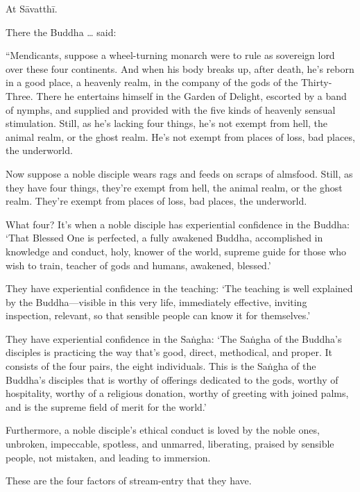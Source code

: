 \documentclass[12pt,openany]{book}%
\begin{document}
At \textsanskrit{Sāvatthī}. 

There the Buddha … said: 

“Mendicants, suppose a wheel-turning monarch were to rule as sovereign lord over these four continents. And when his body breaks up, after death, he’s reborn in a good place, a heavenly realm, in the company of the gods of the Thirty-Three. There he entertains himself in the Garden of Delight, escorted by a band of nymphs, and supplied and provided with the five kinds of heavenly sensual stimulation. Still, as he’s lacking four things, he’s not exempt from hell, the animal realm, or the ghost realm. He’s not exempt from places of loss, bad places, the underworld. 

Now suppose a noble disciple wears rags and feeds on scraps of almsfood. Still, as they have four things, they’re exempt from hell, the animal realm, or the ghost realm. They’re exempt from places of loss, bad places, the underworld. 

What four? It’s when a noble disciple has experiential confidence in the Buddha: ‘That Blessed One is perfected, a fully awakened Buddha, accomplished in knowledge and conduct, holy, knower of the world, supreme guide for those who wish to train, teacher of gods and humans, awakened, blessed.’ 

They have experiential confidence in the teaching: ‘The teaching is well explained by the Buddha—visible in this very life, immediately effective, inviting inspection, relevant, so that sensible people can know it for themselves.’ 

They have experiential confidence in the \textsanskrit{Saṅgha}: ‘The \textsanskrit{Saṅgha} of the Buddha’s disciples is practicing the way that’s good, direct, methodical, and proper. It consists of the four pairs, the eight individuals. This is the \textsanskrit{Saṅgha} of the Buddha’s disciples that is worthy of offerings dedicated to the gods, worthy of hospitality, worthy of a religious donation, worthy of greeting with joined palms, and is the supreme field of merit for the world.’ 

Furthermore, a noble disciple’s ethical conduct is loved by the noble ones, unbroken, impeccable, spotless, and unmarred, liberating, praised by sensible people, not mistaken, and leading to immersion. 

These are the four factors of stream-entry that they have. 
\end{document}
